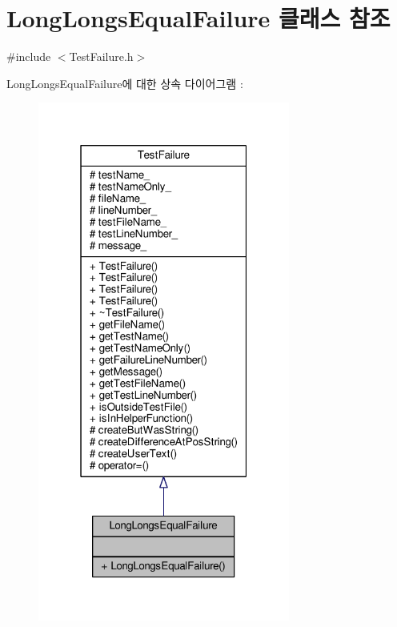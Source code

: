 \hypertarget{class_long_longs_equal_failure}{}\section{Long\+Longs\+Equal\+Failure 클래스 참조}
\label{class_long_longs_equal_failure}


{\ttfamily \#include $<$Test\+Failure.\+h$>$}



Long\+Longs\+Equal\+Failure에 대한 상속 다이어그램 \+: 
\nopagebreak
\begin{figure}[H]
\begin{center}
\leavevmode
\includegraphics[width=235pt]{class_long_longs_equal_failure__inherit__graph}
\end{center}
\end{figure}


